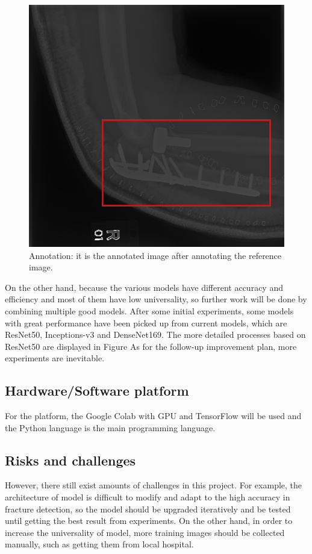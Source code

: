 \documentclass[12pt,oneside,a4paper]{article}
\begin{document}
\begin{figure}[htbp]
\begin{minipage}[t]{0.5\textwidth}
\includegraphics[width=\textwidth]{images/Annotation.png}
 \caption{Annotation: it is the annotated image after annotating the reference image.}
\end{minipage}
\end{figure}

\par On the other hand, because the various models have different accuracy and efficiency and most of them have low universality, so further work will be done by combining multiple good models. After some initial experiments, some models with great performance have been picked up from current models, which are ResNet50, Inceptions-v3 and DenseNet169. The more detailed processes based on ResNet50 are displayed in Figure As for the follow-up improvement plan, more experiments are inevitable. 



\subsection{Hardware/Software platform}
For the platform, the Google Colab with GPU and TensorFlow will be used and the Python language is the main programming language. 
\subsection{Risks and challenges}
However, there still exist amounts of challenges in this project. For example, the architecture of model is difficult to modify and adapt to the high accuracy in fracture detection, so the model should be upgraded iteratively and be tested until getting the best result from experiments. On the other hand, in order to increase the universality of model, more training images should be collected manually, such as getting them from local hospital.
\end{document}
